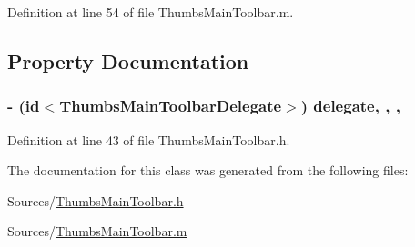 Definition at line 54 of file Thumbs\-Main\-Toolbar.\-m.



\subsection{Property Documentation}
\hypertarget{interface_thumbs_main_toolbar_a193cc895ab3fba1e9a9b119303e98f3f}{
\subsubsection[{delegate}]{\setlength{\rightskip}{0pt plus 5cm}-\/ (id$<${\bf Thumbs\-Main\-Toolbar\-Delegate}$>$) delegate\hspace{0.3cm}{\ttfamily [read]}, {\ttfamily [write]}, {\ttfamily [nonatomic]}, {}}}\label{df/db1/interface_thumbs_main_toolbar_a193cc895ab3fba1e9a9b119303e98f3f}


Definition at line 43 of file Thumbs\-Main\-Toolbar.\-h.



The documentation for this class was generated from the following files\-:\begin{DoxyCompactItemize}
\item 
Sources/\hyperlink{_thumbs_main_toolbar_8h}{Thumbs\-Main\-Toolbar.\-h}\item 
Sources/\hyperlink{_thumbs_main_toolbar_8m}{Thumbs\-Main\-Toolbar.\-m}\end{DoxyCompactItemize}
